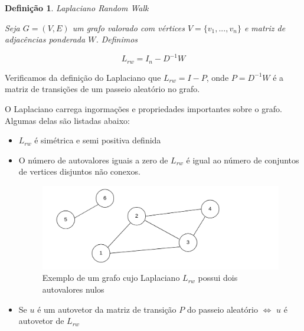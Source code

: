 \documentclass[]{article}
\newtheorem{definition}{Definição}[section]
\begin{document}
\newpage

\begin{definition}{Laplaciano \textit{Random Walk}}\\

\vspace{0.2cm}

Seja $G = (V, E)$ um grafo valorado com vértices $V = \{v_1, ..., v_n\}$ e matriz de adjacências ponderada $W$. Definimos 

\vspace{0.1cm}

$$L_{rw} = I_n - D^{-1}W$$

\end{definition}

\vspace{0.1cm}

Verificamos da definição do Laplaciano que $L_{rw} = I - P$, onde $P = D^{-1}W$ é a matriz de transições de um passeio aleatório no grafo.

O Laplaciano carrega ingormações e propriedades importantes sobre o grafo. Algumas delas são listadas abaixo:


\begin{itemize}
\item $L_{rw}$ é simétrica e semi positiva definida

\vspace{.1cm}

\item O número de autovalores iguais a zero de $L_{rw}$ é igual ao número de conjuntos de vertices disjuntos não conexos.

\begin{figure}
\hspace*{2.3cm}\includegraphics[scale=0.15]{grafo2_pequeno}
\caption{Exemplo de um grafo cujo Laplaciano $L_{rw}$ possui dois autovalores nulos}
\end{figure}

\item  Se $u$ é um autovetor da matriz de transição $P$ do passeio aleatório $\Leftrightarrow$ $u$ é autovetor de $L_{rw}$

\end{itemize}
\end{document}
